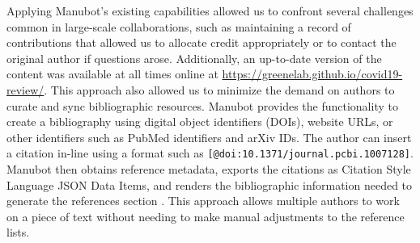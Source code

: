 \documentclass[twocolumn]{ceurart}
\begin{document}
Applying Manubot's existing capabilities allowed us to confront several challenges common in large-scale collaborations, such as maintaining a record of contributions that allowed us to allocate credit appropriately or to contact the original author if questions arose.
Additionally, an up-to-date version of the content was available at all times online at \url{https://greenelab.github.io/covid19-review/}.
This approach also allowed us to minimize the demand on authors to curate and sync bibliographic resources.
Manubot provides the functionality to create a bibliography using digital object identifiers (DOIs), website URLs, or other identifiers such as PubMed identifiers and arXiv IDs.
The author can insert a citation in-line using a format such as \texttt{{[}@doi:10.1371/journal.pcbi.1007128{]}}.
Manubot then obtains reference metadata, exports the citations as Citation Style Language JSON Data Items, and renders the bibliographic information needed to generate the references section \citep{YuJbg3zO}.
This approach allows multiple authors to work on a piece of text without needing to make manual adjustments to the reference lists.
\end{document}
